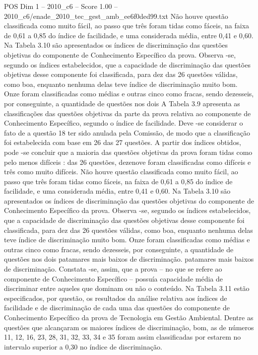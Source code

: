 \begin{textsample}{POS Dim 1 – 2010\_c6 – Score 1.00 – 2010\_c6/enade\_2010\_tec\_gest\_amb\_ee6f0ded99.txt}
Não houve questão classificada como muito fácil, ao passo que três foram tidas como fáceis, na faixa de 0,61 a 0,85 do índice de facilidade, e uma considerada média, entre 0,41 e 0,60.
Na Tabela 3.10 são apresentados os índices de discriminação das questões objetivas do componente de Conhecimento Específico da prova.
Observa -se, segundo os índices estabelecidos, que a capacidade de discriminação das questões objetivas desse componente foi classificada, para dez das 26 questões válidas, como boa, enquanto nenhuma delas teve índice de discriminação muito bom.
Onze foram classificadas como médias e outras cinco como fracas, sendo dezesseis, por conseguinte, a quantidade de questões nos dois A Tabela 3.9 apresenta as classificações das questões objetivas da parte da prova relativa ao componente de Conhecimento Específico, segundo o índice de facilidade.
Deve -se considerar o fato de a questão 18 ter sido anulada pela Comissão, de modo que a classificação foi estabelecida com base em 26 das 27 questões.
A partir dos índices obtidos, pode -se concluir que a maioria das questões objetivas da prova foram tidas como pelo menos difíceis : das 26 questões, dezenove foram classificadas como difíceis e três como muito difíceis.
Não houve questão classificada como muito fácil, ao passo que três foram tidas como fáceis, na faixa de 0,61 a 0,85 do índice de facilidade, e uma considerada média, entre 0,41 e 0,60.
Na Tabela 3.10 são apresentados os índices de discriminação das questões objetivas do componente de Conhecimento Específico da prova.
Observa -se, segundo os índices estabelecidos, que a capacidade de discriminação das questões objetivas desse componente foi classificada, para dez das 26 questões válidas, como boa, enquanto nenhuma delas teve índice de discriminação muito bom.
Onze foram classificadas como médias e outras cinco como fracas, sendo dezesseis, por conseguinte, a quantidade de questões nos dois patamares mais baixos de discriminação. patamares mais baixos de discriminação.
Constata -se, assim, que a prova – no que se refere ao componente de Conhecimento Específico – possuía capacidade média de discriminar entre aqueles que dominam ou não o conteúdo.
Na Tabela 3.11 estão especificados, por questão, os resultados da análise relativa aos índices de facilidade e de discriminação de cada uma das questões do componente de Conhecimento Específico da prova de Tecnologia em Gestão Ambiental.
Dentre as questões que alcançaram os maiores índices de discriminação, bom, as de números 11, 12, 16, 23, 28, 31, 32, 33, 34 e 35 foram assim classificadas por estarem no intervalo superior a 0,30 no índice de discriminação.

\end{textsample}
